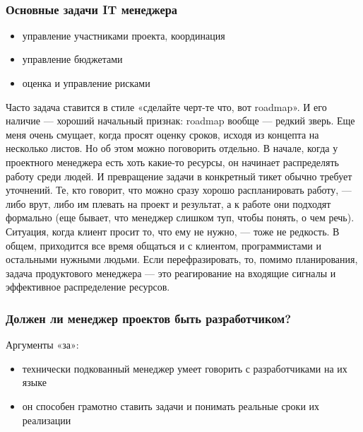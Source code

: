 \documentclass{../industrial-development}
\begin{document}
~\cite{Best_qualities_for_IT-manager}

\begin{frame} \frametitle{Основные задачи IT менеджера}
	\begin{itemize}

		\item управление участниками проекта, координация
		\item управление бюджетами
		\item оценка и управление рисками
	\end{itemize}
\end{frame}
\lecturenotes
Часто задача ставится в стиле «сделайте черт-те что, вот roadmap». И его наличие — хороший начальный признак: roadmap вообще — редкий зверь. Еще меня очень смущает, когда просят оценку сроков, исходя из концепта на несколько листов. Но об этом можно поговорить отдельно.
В начале, когда у проектного менеджера есть хоть какие-то ресурсы, он начинает распределять работу среди людей. И превращение задачи в конкретный тикет обычно требует уточнений. Те, кто говорит, что можно сразу хорошо распланировать работу, — либо врут, либо им плевать на проект и результат, а к работе они подходят формально (еще бывает, что менеджер слишком туп, чтобы понять, о чем речь). Ситуация, когда клиент просит то, что ему не нужно, — тоже не редкость. В общем, приходится все время общаться и с клиентом, программистами и остальными нужными людьми.
Если перефразировать, то, помимо планирования, задача продуктового менеджера — это реагирование на входящие сигналы и эффективное распределение ресурсов.
~\cite{Best_qualities_for_IT-manager}

\begin{frame} \frametitle{Должен ли менеджер проектов быть разработчиком?}
	\begin{block}{Аргументы «за»:}
		\begin{itemize}
			\item технически подкованный менеджер умеет говорить с разработчиками на их языке
			\item он способен грамотно ставить задачи и понимать реальные сроки их реализации
		\end{itemize}
	\end{block}

\end{frame}
\lecturenotes
~\cite{Best_qualities_for_IT-manager}
\end{document}
